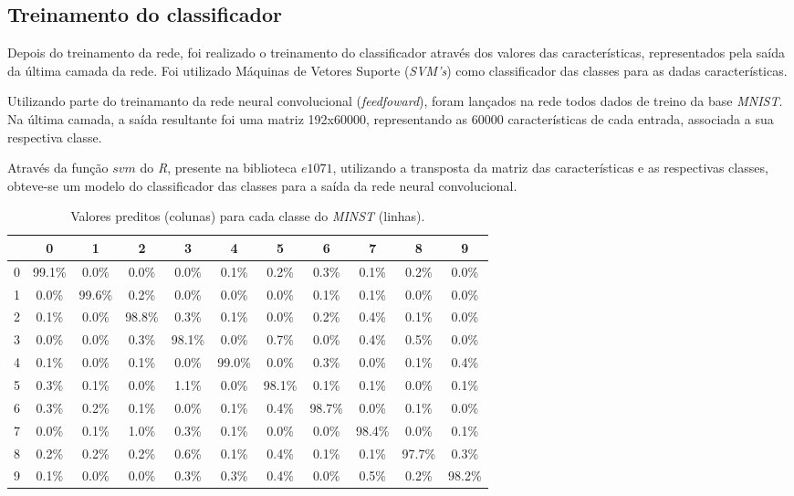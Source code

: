 \documentclass[conference]{IEEEtran}
\begin{document}
\subsection{Treinamento do classificador} \label{metod:svm}

Depois do treinamento da rede, foi realizado o treinamento do classificador através dos valores das características, representados pela saída da última camada da rede. Foi utilizado Máquinas de Vetores Suporte (\textit{SVM's}) como classificador das classes para as dadas características.

Utilizando parte do treinamanto da rede neural convolucional (\textit{feedfoward}), foram lançados na rede todos dados de treino da base \textit{MNIST}. Na última camada, a saída resultante foi uma matriz 192x60000, representando as 60000 características de cada entrada, associada a sua respectiva classe.

Através da função $svm$ do \textit{R}, presente na biblioteca $e1071$, utilizando a transposta da matriz das características e as respectivas classes, obteve-se um modelo do classificador das classes para a saída da rede neural convolucional.



\begin{table}[h]
\caption{Valores preditos (colunas) para cada classe do \textit{MINST} (linhas).}
\begin{center}
\begin{tabular}{c|cccccccccc}
   & 0           & 1            & 2           & 3           & 4            & 5           & 6           & 7            & 8           & 9           \\ \hline
0 & 99.1\% &   0.0\% &   0.0\% &   0.0\% &   0.1\% &   0.2\% &   0.3\% &   0.1\% &   0.2\% &   0.0\% \\
1 &   0.0\% & 99.6\% &   0.2\% &   0.0\% &   0.0\% &   0.0\% &   0.1\% &   0.1\% &   0.0\% &   0.0\% \\
2 &   0.1\% &   0.0\% & 98.8\% &   0.3\% &   0.1\% &   0.0\% &   0.2\% &   0.4\% &   0.1\% &   0.0\% \\
3 &   0.0\% &   0.0\% &   0.3\% & 98.1\% &   0.0\% &   0.7\% &   0.0\% &   0.4\% &   0.5\% &   0.0\% \\
4 &   0.1\% &   0.0\% &   0.1\% &   0.0\% & 99.0\% &   0.0\% &   0.3\% &   0.0\% &   0.1\% &   0.4\% \\
5 &   0.3\% &   0.1\% &   0.0\% &   1.1\% &   0.0\% & 98.1\% &   0.1\% &   0.1\% &   0.0\% &   0.1\% \\
6 &   0.3\% &   0.2\% &   0.1\% &   0.0\% &   0.1\% &   0.4\% & 98.7\% &   0.0\% &   0.1\% &   0.0\% \\
7 &   0.0\% &   0.1\% &   1.0\% &   0.3\% &   0.1\% &   0.0\% &   0.0\% & 98.4\% &   0.0\% &   0.1\% \\
8 &   0.2\% &   0.2\% &   0.2\% &   0.6\% &   0.1\% &   0.4\% &   0.1\% &   0.1\% & 97.7\% &   0.3\% \\
9 &   0.1\% &   0.0\% &   0.0\% &   0.3\% &   0.3\% &   0.4\% &   0.0\% &   0.5\% &   0.2\% & 98.2\%
\end{tabular}
\label{tabemnist}
\end{center}
\end{table}
\end{document}
